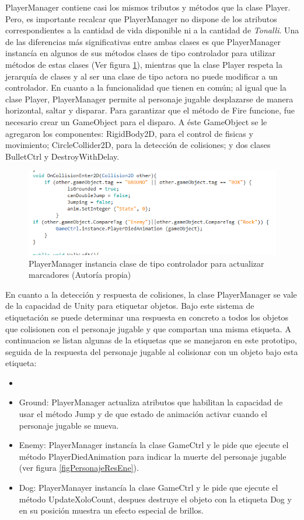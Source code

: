 PlayerManager contiene casi los mismos tributos y métodos que la clase Player. 
Pero, es importante recalcar que PlayerManager no dispone de los atributos 
correspondientes a la cantidad de vida disponible ni a la cantidad de 
\textit{Tonalli}. Una de las diferencias más significativas entre ambas clases es que 
PlayerManager instancía en algunos de sus métodos clases de tipo controlador 
para utilizar métodos de estas clases (Ver figura \ref{figInstanciaCtrl}), 
mientras que la clase Player respeta la jerarquía de clases y al ser una clase de 
tipo actora no puede modificar a un controlador. En cuanto a la funcionalidad que 
tienen en común; al igual que la clase Player, PlayerManager permite al personaje jugable desplazarse de manera horizontal, saltar y disparar. Para garantizar que el método de Fire funcione, fue necesario crear un GameObject para el disparo. A éste 
GameObject se le agregaron los componentes: RigidBody2D, para el control de fisicas 
y movimiento; CircleCollider2D, para la detección de colisiones; y dos clases BulletCtrl 
y DestroyWithDelay.
\\
\par
 
\begin{figure}
  \centering
   \includegraphics[width=0.6 \textwidth]{05TrabajoRealizado/03Unity/imagenes/02GatoCtrl}
  \caption{PlayerManager instancia clase de tipo controlador para actualizar marcadores (Autoría propia)}
  \label{figInstanciaCtrl}
\end{figure} 


En cuanto a la detección y respuesta de colisiones, la clase PlayerManager se 
vale de la capacidad de Unity para etiquetar objetos. Bajo este sistema de 
etiquetación se puede determinar una respuesta en concreto a todos los objetos 
que colisionen con el personaje jugable y que compartan una misma etiqueta. A 
continuacion se listan algunas de la etiquetas que se manejaron en este prototipo, 
seguida de la respuesta del personaje jugable al colisionar con un 
objeto bajo esta etiqueta:
\begin{itemize}
	\item \item Ground: PlayerManager actualiza atributos que habilitan la capacidad 
	de usar el método Jump y de que estado de animación activar cuando el personaje 
	jugable se mueva.
	\item Enemy: PlayerManager instancía la clase GameCtrl y le pide que ejecute el 
	método PlayerDiedAnimation para indicar la muerte del personaje jugable (ver 
	figura \ref{figPersonajeResEne}).
	\item Dog: PlayerManayer instancía la clase GameCtrl y le pide que ejecute el 
	método UpdateXoloCount, despues destruye el objeto con la etiqueta Dog 
	y en su posición muestra un efecto especial de brillos. 
\end{itemize} 

